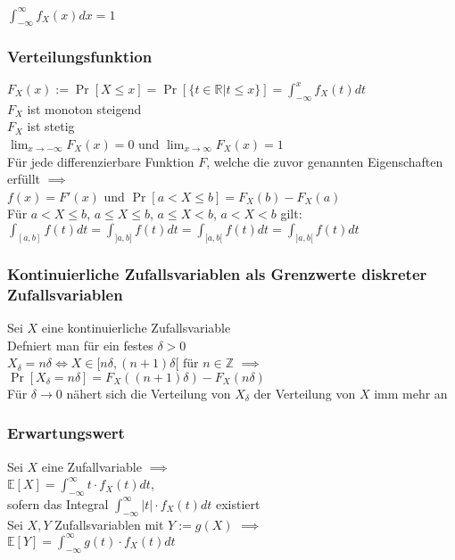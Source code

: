 \documentclass[a4paper,9pt]{extarticle}
\begin{document}
$\int_{-∞}^{∞} f_X(x) dx = 1$

\subsubsection*{Verteilungsfunktion}
$F_X(x) := \Pr[X ≤ x] = \Pr[\{t \in \mathbb{R} | t ≤ x \}] = \int_{-∞}^x f_X(t) dt$ \\
$F_X$ ist monoton steigend \\
$F_X$ ist stetig \\
$\lim_{x → -∞} F_X(x) = 0$ und $\lim_{x → ∞} F_X(x) = 1$ \\

Für jede differenzierbare Funktion $F$, welche die zuvor genannten Eigenschaften erfüllt $\implies$ \\
$f(x) = F'(x)$ und $\Pr[a < X ≤ b] = F_X(b) - F_X(a)$ \\

Für $a < X ≤ b$, $a ≤ X ≤ b$, $a ≤ X < b$, $a < X < b$ gilt: \\
$\int_{[a,b]} f(t) dt = \int_{]a,b]} f(t) dt = \int_{[a,b[} f(t) dt = \int_{]a,b[} f(t) dt$

\subsubsection*{Kontinuierliche Zufallsvariablen als Grenzwerte diskreter Zufallsvariablen}
Sei $X$ eine kontinuierliche Zufallsvariable \\
Defniert man für ein festes $\delta > 0$ \\ 
$X_\delta = n\delta \iff X \in [n\delta, (n+1)\delta[ \text{ für } n \in \mathbb{Z}$ $\implies$\\
$\Pr[X_\delta = n\delta] = F_X((n + 1)\delta) - F_X(n\delta)$ \\

Für $\delta → 0$ nähert sich die Verteilung von $X_\delta$ der Verteilung von $X$ imm mehr an 

\subsubsection*{Erwartungswert}
Sei $X$ eine Zufallvariable $\implies$ \\
$\mathbb{E}[X] = \int_{-∞}^∞ t ⋅ f_X(t) dt$, \\
sofern das Integral $\int_{-∞}^∞ |t| ⋅ f_X(t) dt$ existiert \\

Sei $X, Y$ Zufallsvariablen mit $Y := g(X)$ $\implies$ \\
$\mathbb{E}[Y] = \int_{-∞}^∞ g(t) ⋅ f_X(t) dt$
\end{document}
